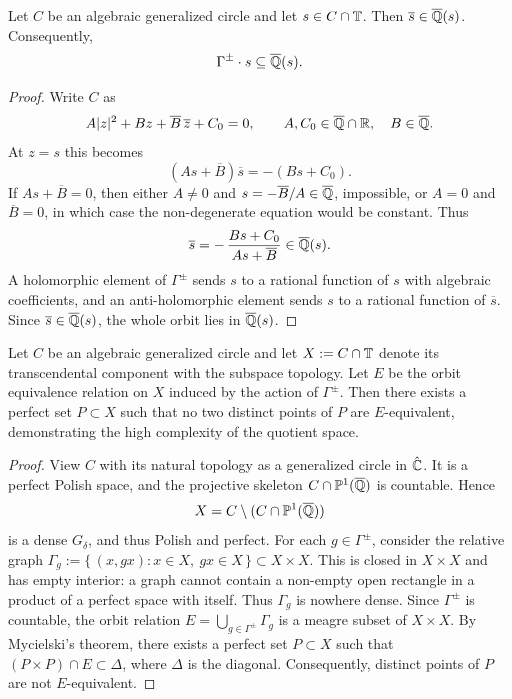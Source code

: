 \begin{lemma}\label{grct:lem:coordinate-field-trap}
	Let $C$ be an algebraic generalized circle and let $s\in C\cap\mathbb{T}$. Then $\overline{s}\in\overline{\mathbb{Q}}(s)$. Consequently,
	\[
		\Gamma^{\pm}\cdot s\subseteq \overline{\mathbb{Q}}(s).
	\]
\end{lemma}
\begin{proof}
	Write $C$ as
	\[
		A|z|^2+Bz+\overline B\,\overline z+C_0=0,
		\qquad A,C_0\in\overline{\mathbb{Q}}\cap\mathbb{R},\quad B\in\overline{\mathbb{Q}}.
	\]
	At $z=s$ this becomes
	\[
		(A s+\overline B)\overline{s}=-(Bs+C_0).
	\]
	If $A s+\overline B=0$, then either $A\ne0$ and $s=-\overline B/A\in\overline{\mathbb{Q}}$, impossible, or $A=0$ and $\overline B=0$, in which case the non-degenerate equation would be constant. Thus
	\[
		\overline{s}=-\,\frac{Bs+C_0}{A s+\overline B}\in\overline{\mathbb{Q}}(s).
	\]
	A holomorphic element of $\Gamma^{\pm}$ sends $s$ to a rational function of $s$ with algebraic coefficients, and an anti-holomorphic element sends $s$ to a rational function of $\overline s$. Since $\overline s\in\overline{\mathbb{Q}}(s)$, the whole orbit lies in $\overline{\mathbb{Q}}(s)$.
\end{proof}

\begin{theorem}\label{grct:thm:perfect-antichain}
	Let $C$ be an algebraic generalized circle and let $X:=C\cap\mathbb{T}$ denote its transcendental component with the subspace topology. Let $E$ be the orbit equivalence relation on $X$ induced by the action of $\Gamma^{\pm}$. Then there exists a perfect set $P\subset X$ such that no two distinct points of $P$ are $E$-equivalent, demonstrating the high complexity of the quotient space.
\end{theorem}
\begin{proof}
	View $C$ with its natural topology as a generalized circle in $\hat{\mathbb{C}}$. It is a perfect Polish space, and the projective skeleton $C\cap\mathbb{P}^{1}(\overline{\mathbb{Q}})$ is countable. Hence
	\[
		X=C\setminus(C\cap\mathbb{P}^{1}(\overline{\mathbb{Q}}))
	\]
	is a dense $G_\delta$, and thus Polish and perfect. For each $g\in\Gamma^{\pm}$, consider the relative graph
	\(
	\Gamma_g:=\{\,(x,gx):x\in X,\ gx\in X\,\}\subset X\times X.
	\)
	This is closed in $X\times X$ and has empty interior: a graph cannot contain a non-empty open rectangle in a product of a perfect space with itself. Thus $\Gamma_g$ is nowhere dense. Since $\Gamma^{\pm}$ is countable, the orbit relation $E=\bigcup_{g\in\Gamma^{\pm}}\Gamma_g$ is a meagre subset of $X\times X$. By Mycielski’s theorem, there exists a perfect set $P\subset X$ such that $(P\times P)\cap E\subset\Delta$, where $\Delta$ is the diagonal. Consequently, distinct points of $P$ are not $E$-equivalent.
\end{proof}


